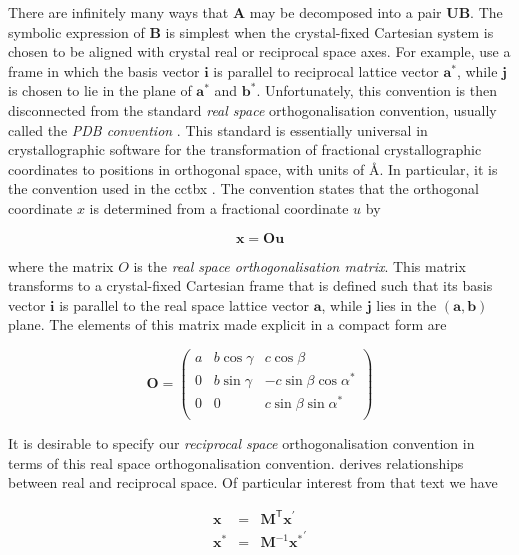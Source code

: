 \documentclass[a4paper, 11pt]{article}
\renewcommand{\vec}[1]{\mathbf{#1}}
\begin{document}
There are infinitely many ways that $\mathbf{A}$ may be decomposed into a pair
$\mathbf{U} \mathbf{B}$. The symbolic expression of $\mathbf{B}$ is simplest when
the crystal-fixed Cartesian system is chosen to be aligned with crystal real or
reciprocal space axes. For example, \citet{Busing1967diffractometers} use a frame
in which the basis vector $\vec{i}$ is parallel to reciprocal lattice vector
$\vec{a^*}$, while $\vec{j}$ is chosen to lie in the plane of $\vec{a^*}$ and
$\vec{b^*}$. Unfortunately, this convention is then disconnected from the
standard \emph{real space} orthogonalisation convention, usually called the \emph{PDB
convention} \citep{PDB1992atomic}. This standard is essentially universal in
crystallographic software for the transformation of fractional crystallographic
coordinates to positions in orthogonal space, with units of \AA. In particular, it
is the convention used in the cctbx \citep{GrosseKunstleve2002cctbx}. The
convention states that the orthogonal coordinate $x$ is determined from a
fractional coordinate $u$ by

\begin{equation}
\label{eq:realspaceortho}
\vec{x} = \mathbf{O} \vec{u}
\end{equation}

where the matrix $O$ is the \emph{real space orthogonalisation matrix}. This matrix
transforms to a crystal-fixed Cartesian frame that is defined such that its basis
vector $\vec{i}$ is parallel to the real space lattice vector $\vec{a}$, while
$\vec{j}$ lies in the $(\vec{a}, \vec{b})$ plane. The elements of this matrix
made explicit in a compact form are

\begin{equation}
\label{eq:realspaceorthomatrix}
\mathbf{O} = 
\begin{pmatrix}
a & b\cos{\gamma} &  c\cos{\beta} \\
0 & b\sin{\gamma} & -c\sin{\beta}\cos{\alpha^*} \\
0 & 0             &  c\sin{\beta}\sin{\alpha^*} \\
\end{pmatrix}
\end{equation}

It is desirable to specify our \emph{reciprocal space} orthogonalisation convention in 
terms of this real space orthogonalisation convention. \citet{giacovazzo2002fundamentals}
derives relationships between real and reciprocal space. Of particular interest
from that text we have

\begin{eqnarray}
\label{eq:realreciprocaltransforms}
\vec{x} & = & \mathbf{M}^\mathsf{T} \vec{x}^\prime \nonumber \\
\vec{x^*} & = & \mathbf{M}^{-1} \vec{x^*}^\prime
\end{eqnarray}
\end{document}
